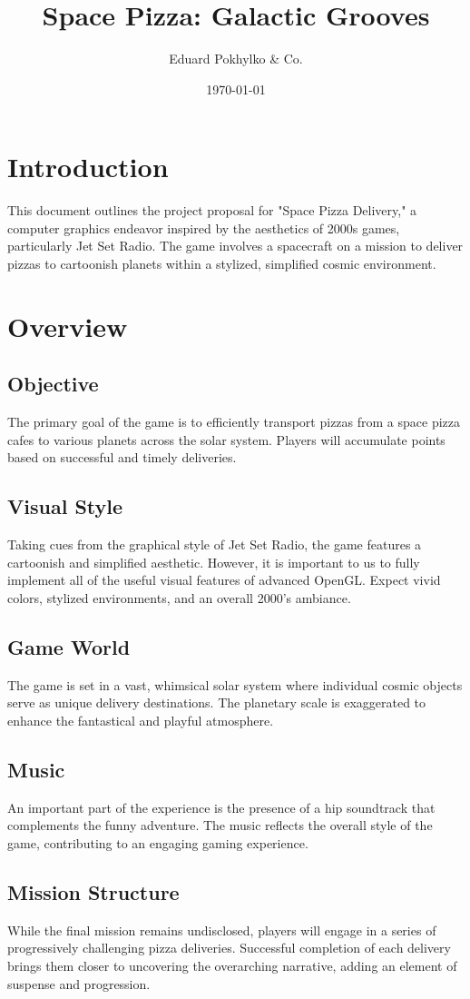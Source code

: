 \documentclass[a4paper,12pt]{article}
\title{Space Pizza: Galactic Grooves}
\author{Eduard Pokhylko & Co.}
\date{\today}
\begin{document}
\section{Introduction}
This document outlines the project proposal for "Space Pizza Delivery," a computer graphics endeavor inspired by the aesthetics of 2000s games, particularly Jet Set Radio. The game involves a spacecraft on a mission to deliver pizzas to cartoonish planets within a stylized, simplified cosmic environment.

\section{Overview}
\subsection{Objective}
The primary goal of the game is to efficiently transport pizzas from a space pizza cafes to various planets  across the solar system. Players will accumulate points based on successful and timely deliveries.

\subsection{Visual Style}
Taking cues from the graphical style of Jet Set Radio, the game features a cartoonish and simplified aesthetic. However, it is important to us to fully implement all of the useful visual features of advanced OpenGL. Expect vivid colors, stylized environments, and an overall 2000's ambiance.

\subsection{Game World}
The game is set in a vast, whimsical solar system where individual cosmic objects serve as unique delivery destinations. The planetary scale is exaggerated to enhance the fantastical and playful atmosphere.

\subsection{Music}
An important part of the experience is the presence of a hip soundtrack that complements the funny adventure. The music reflects the overall style of the game, contributing to an engaging gaming experience.

\subsection{Mission Structure}
While the final mission remains undisclosed, players will engage in a series of progressively challenging pizza deliveries. Successful completion of each delivery brings them closer to uncovering the overarching narrative, adding an element of suspense and progression.
\end{document}

